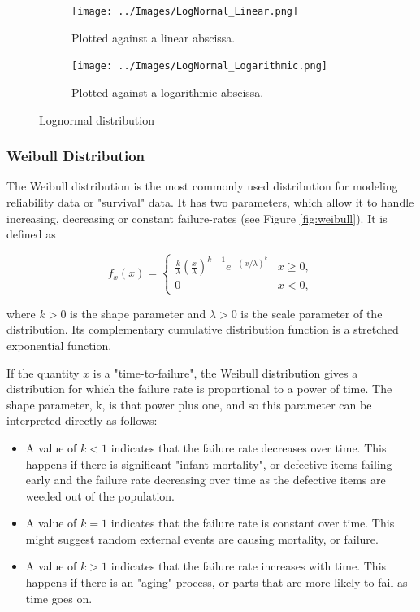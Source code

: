 \begin{figure}
\centering
\begin{subfigure}{.5\textwidth}
  \centering
  \texttt{[image: ../Images/LogNormal\_Linear.png]}
  \caption{Plotted against a linear abscissa.}
  \label{fig:Lognormal_Sub1}
\end{subfigure}%
\begin{subfigure}{.5\textwidth}
  \centering
  \texttt{[image: ../Images/LogNormal\_Logarithmic.png]}
  \caption{Plotted against a logarithmic abscissa.}
  \label{fig:Lognormal_Sub2}
\end{subfigure}
\caption{Lognormal distribution}
\label{fig:lognormal}
\end{figure}

\subsubsection{Weibull Distribution}\label{sec:Weibull}

The Weibull distribution is the most commonly used distribution for modeling reliability data or "survival" data. It has two parameters, which allow it to handle increasing, decreasing or constant failure-rates (see Figure \ref{fig:weibull}).
It is defined as

\begin{equation}\label{eq:weibull}
f_x (x) =
  \begin{cases}
    \frac{k}{\lambda}\left(\frac{x}{\lambda}\right)^{k-1}e^{-(x/\lambda)^{k}} & x\geq0 ,\\
    0 & x<0 ,
    \end{cases}
\end{equation}

where $k > 0$ is the shape parameter and $\lambda > 0$ is the scale parameter of the distribution. Its complementary cumulative distribution function is a stretched exponential function.

If the quantity $x$ is a "time-to-failure", the Weibull distribution gives a distribution for which the failure rate is proportional to a power of time. The shape parameter, k, is that power plus one, and so this parameter can be interpreted directly as follows:

\begin{itemize}
  \item  A value of $k < 1$ indicates that the failure rate decreases over time. This happens if there is significant "infant mortality", or defective items failing early and the failure rate decreasing over time as the defective items are weeded out of the population.

  \item  A value of $k = 1$ indicates that the failure rate is constant over time. This might suggest random external events are causing mortality, or failure.
  \item  A value of $k > 1$ indicates that the failure rate increases with time. This happens if there is an "aging" process, or parts that are more likely to fail as time goes on.
\end{itemize}

